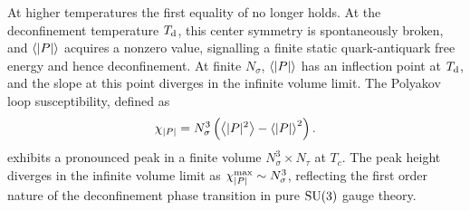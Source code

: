 At higher temperatures the first equality of 
no longer holds. At the deconfinement temperature $T_{\rm d}$, this center symmetry
is spontaneously broken, and $\ev{|P|}$ acquires a nonzero value, signalling
a finite static quark-antiquark free energy and hence deconfinement.
At finite $N_\sigma$, $\ev{|P|}$ has an inflection point at $T_{\rm d}$, and
the slope at this point diverges in the infinite volume limit. The Polyakov
loop susceptibility, defined as
\begin{equation}\index{Polyakov loop!susceptibility}
  \chi_{|P|}=N_\sigma^3\left(\ev{|P|^2}-\ev{|P|}^2\right).
\end{equation}
exhibits a pronounced peak in a finite volume $N_\sigma^3\times N_\tau$ at
$T_c$. The peak height diverges in the infinite volume limit as
$\chi^{\rm max}_{|P|}\sim N_\sigma^3$, reflecting the first order nature of
the deconfinement phase transition in pure $\operatorname{SU}(3)$ gauge theory.

